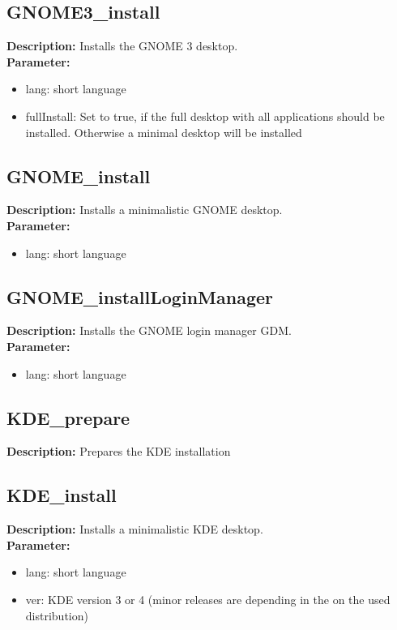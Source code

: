 \subsection{GNOME3\_install}
\textbf{Description:} Installs the GNOME 3 desktop.\\
\textbf{Parameter:}
\begin{itemize}
\item lang: short language
\item fullInstall: Set to true, if the full desktop with all applications should be installed. Otherwise a minimal desktop will be installed
\end{itemize}

\subsection{GNOME\_install}
\textbf{Description:} Installs a minimalistic GNOME desktop.\\
\textbf{Parameter:}
\begin{itemize}
\item lang: short language
\end{itemize}

\subsection{GNOME\_installLoginManager}
\textbf{Description:} Installs the GNOME login manager GDM.\\
\textbf{Parameter:}
\begin{itemize}
\item lang: short language
\end{itemize}

\subsection{KDE\_prepare}
\textbf{Description:} Prepares the KDE installation\\

\subsection{KDE\_install}
\textbf{Description:} Installs a minimalistic KDE desktop.\\
\textbf{Parameter:}
\begin{itemize}
\item lang: short language
\item ver: KDE version 3 or 4 (minor releases are depending in the on the used distribution)
\end{itemize}

